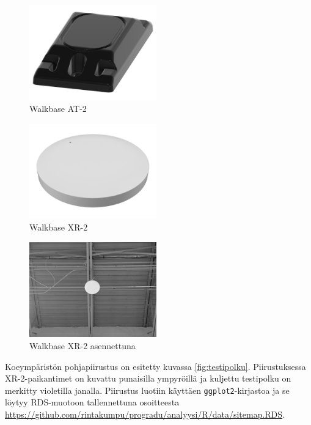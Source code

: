 \documentclass[
  12pt,
  a4paper, twoside]{book}
\begin{document}
\begin{multicols}{2}
\begin{figure}[H]
\centering
\includegraphics[width=5.5cm]{at_2}
\caption{Walkbase AT-2}
\label{fig:at2}
\end{figure}

\begin{figure}[H]
\centering
\includegraphics[width=5.5cm]{xr_2_plain}
\caption{Walkbase XR-2}
\label{fig:xr2}
\end{figure}
\end{multicols}

\begin{figure}[H]
\centering
\includegraphics[width=5.5cm]{xr_2_installed}
\caption{Walkbase XR-2 asennettuna}
\label{fig:xr2_installed}
\end{figure}

Koeympäristön pohjapiirustus on esitetty kuvassa \ref{fig:testipolku}. Piirustuksessa XR-2-paikantimet on kuvattu punaisilla ympyröillä ja kuljettu testipolku on merkitty violetilla janalla. Piirustus luotiin käyttäen \texttt{ggplot2}-kirjastoa ja se löytyy RDS-muotoon tallennettuna osoitteesta \newline \url{https://github.com/rintakumpu/progradu/analyysi/R/data/sitemap.RDS}.
\end{document}
